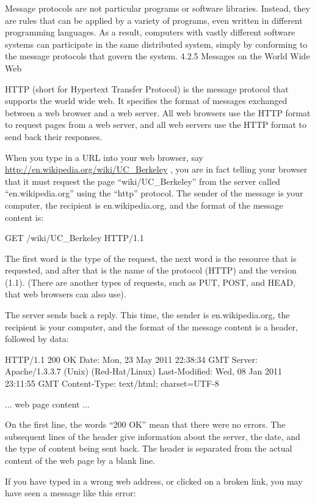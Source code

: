 \documentclass[letterpaper,10pt,dvipdfmx]{sphinxmanual}
\begin{document}
Message protocols are not particular programs or software libraries. Instead, they are rules that can be applied by a variety of programs, even written in different programming languages. As a result, computers with vastly different software systems can participate in the same distributed system, simply by conforming to the message protocols that govern the system.
4.2.5   Messages on the World Wide Web

HTTP (short for Hypertext Transfer Protocol) is the message protocol that supports the world wide web. It specifies the format of messages exchanged between a web browser and a web server. All web browsers use the HTTP format to request pages from a web server, and all web servers use the HTTP format to send back their responses.

When you type in a URL into your web browser, say \href{http://en.wikipedia.org/wiki/UC\_Berkeley}{http://en.wikipedia.org/wiki/UC\_Berkeley} , you are in fact telling your browser that it must request the page ``wiki/UC\_Berkeley'' from the server called ``en.wikipedia.org'' using the ``http'' protocol. The sender of the message is your computer, the recipient is en.wikipedia.org, and the format of the message content is:

GET /wiki/UC\_Berkeley HTTP/1.1

The first word is the type of the request, the next word is the resource that is requested, and after that is the name of the protocol (HTTP) and the version (1.1). (There are another types of requests, such as PUT, POST, and HEAD, that web browsers can also use).

The server sends back a reply. This time, the sender is en.wikipedia.org, the recipient is your computer, and the format of the message content is a header, followed by data:

HTTP/1.1 200 OK
Date: Mon, 23 May 2011 22:38:34 GMT
Server: Apache/1.3.3.7 (Unix) (Red-Hat/Linux)
Last-Modified: Wed, 08 Jan 2011 23:11:55 GMT
Content-Type: text/html; charset=UTF-8

... web page content ...

On the first line, the words ``200 OK'' mean that there were no errors. The subsequent lines of the header give information about the server, the date, and the type of content being sent back. The header is separated from the actual content of the web page by a blank line.

If you have typed in a wrong web address, or clicked on a broken link, you may have seen a message like this error:
\end{document}
